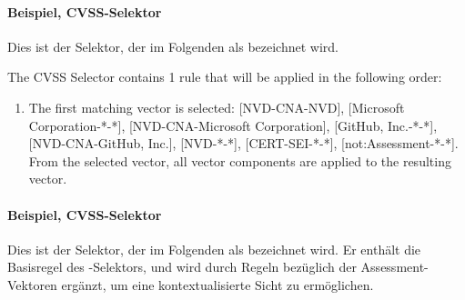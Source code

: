 \paragraph{Beispiel, CVSS-Selektor } \label{par:projektbericht-loesungsweg-cvss-selection-example-selector-initial}

Dies ist der Selektor, der im Folgenden als  bezeichnet wird.

\noindent The CVSS Selector contains 1 rule that will be applied in the following order:
\begin{enumerate}[noitemsep]
    \item The first matching vector is selected: [NVD-CNA-NVD], [Microsoft Corporation-*-*], [NVD-CNA-Microsoft Corporation], [GitHub, Inc.-*-*], [NVD-CNA-GitHub, Inc.], [NVD-*-*], [CERT-SEI-*-*], [not:Assessment-*-*]. From the selected vector, all vector components are applied to the resulting vector.
\end{enumerate}

\paragraph{Beispiel, CVSS-Selektor } \label{par:projektbericht-loesungsweg-cvss-selection-example-selector-context}

Dies ist der Selektor, der im Folgenden als  bezeichnet wird.
Er enthält die Basisregel des -Selektors, und wird durch Regeln bezüglich der Assessment-Vektoren ergänzt, um eine kontextualisierte Sicht zu ermöglichen.

